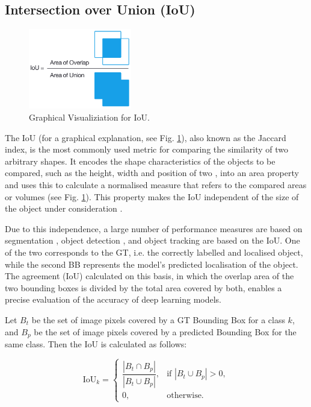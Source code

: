 \subsection{Intersection over Union (IoU)}

\begin{figure}[h]
    \centering
    \includegraphics[width=0.4\textwidth]{images/011Fundamentals/IoU.png}
    \caption{Graphical Visualiziation for IoU. \cite{iou_pic}}
    \label{fig:IoU}
\end{figure}

The \acrfull{IoU} (for a graphical explanation, see Fig. \ref{fig:IoU}), also known as the Jaccard index, is the most commonly used metric for comparing the similarity of two arbitrary shapes. It encodes the shape characteristics of the objects to be compared, such as the height, width and position of two , into an area property and uses this to calculate a normalised measure that refers to the compared areas or volumes (see Fig. \ref{fig:IoU}). This property makes the \acrshort{IoU} independent of the size of the object under consideration \cite{Rezatofighi2019}.

Due to this independence, a large number of performance measures are based on segmentation \cite{Ramirez2019,cordts2016,Zhou2017,lin2015}, object detection \cite{lin2015,Everingham2010}, and object tracking \cite{Kristan2016,lealtaixé2015} are based on the \acrshort{IoU}. One of the two  corresponds to the \acrfull{GT}, i.e. the correctly labelled and localised object, while the second \acrshort{BB} represents the model's predicted localisation of the object. The agreement (\acrshort{IoU}) calculated on this basis, in which the overlap area of the two bounding boxes is divided by the total area covered by both, enables a precise evaluation of the accuracy of deep learning models.
\begin{definition}
    Let $B_t$ be the set of image pixels covered by a \acrlong{GT} Bounding Box for a class $k$, 
    and $B_p$ be the set of image pixels covered by a predicted Bounding Box for the same class. 
    Then the IoU is calculated as follows:

    \begin{equation}
    \text{IoU}_k =
    \begin{cases}
        \dfrac{|B_t \cap B_p|}{|B_t \cup B_p|}, & \text{if } |B_t \cup B_p| > 0, \\[6pt]
        0, & \text{otherwise.}
    \end{cases}
    \end{equation}

\end{definition}








